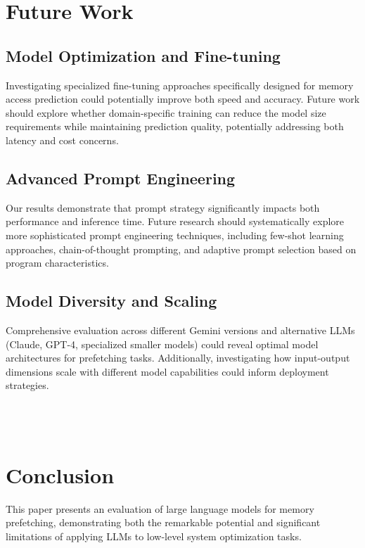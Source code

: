 \documentclass[sigconf,authorversion,nonacm]{acmart}
\begin{document}
\section{Future Work}
\label{sec:future}


\subsection{Model Optimization and Fine-tuning}
Investigating specialized fine-tuning approaches specifically designed for memory access prediction could potentially improve both speed and accuracy. Future work should explore whether domain-specific training can reduce the model size requirements while maintaining prediction quality, potentially addressing both latency and cost concerns.

\subsection{Advanced Prompt Engineering}
Our results demonstrate that prompt strategy significantly impacts both performance and inference time. Future research should systematically explore more sophisticated prompt engineering techniques, including few-shot learning approaches, chain-of-thought prompting, and adaptive prompt selection based on program characteristics.

\subsection{Model Diversity and Scaling}
Comprehensive evaluation across different Gemini versions and alternative LLMs (Claude, GPT-4, specialized smaller models) could reveal optimal model architectures for prefetching tasks. Additionally, investigating how input-output dimensions scale with different model capabilities could inform deployment strategies.
\\
\\
\\
\\

\section{Conclusion}
\label{sec:conclusion}

This paper presents an evaluation of large language models for memory prefetching, demonstrating both the remarkable potential and significant limitations of applying LLMs to low-level system optimization tasks.
\end{document}

